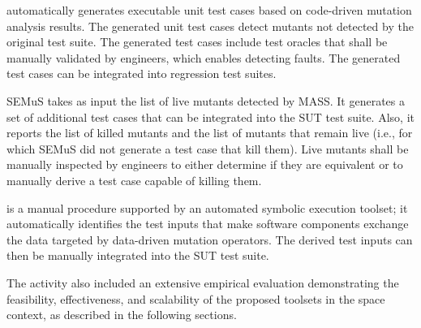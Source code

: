  automatically generates executable unit test cases based on code-driven mutation analysis results. The generated unit test cases detect mutants not detected by the original test suite. The generated test cases include test oracles that shall be manually validated by engineers, which enables detecting faults. The generated test cases can be integrated into regression test suites.

SEMuS takes as input the list of live mutants detected by MASS. It generates a set of additional test cases that can be integrated into the SUT test suite. Also, it reports the list of killed mutants and the list of mutants that remain live (i.e., for which SEMuS did not generate a test case that kill them). Live mutants shall be manually inspected by engineers to either determine if they are equivalent or to manually derive a test case capable of killing them.

 is a manual procedure supported by an automated symbolic execution toolset; it automatically identifies the test inputs that make software components exchange the data targeted by data-driven mutation operators. The derived test inputs can then be manually integrated into the SUT test suite.
 
The activity also included an extensive empirical evaluation demonstrating the feasibility, effectiveness, and scalability of the proposed toolsets in the space context, as described in the following sections.
 


